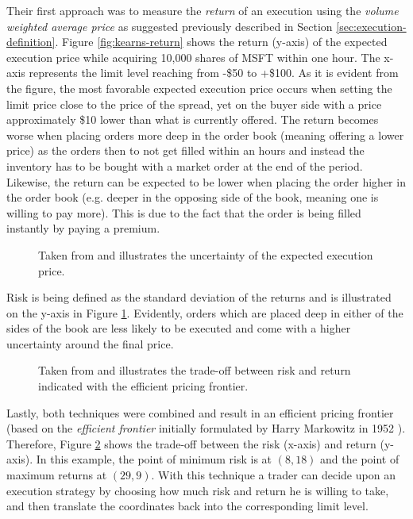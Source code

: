 Their first approach was to measure the \textit{return} of an execution using the \textit{volume weighted average price} as suggested previously described in Section \ref{sec:execution-definition}.
Figure \ref{fig:kearns-return} shows the return (y-axis) of the expected execution price while acquiring 10,000 shares of MSFT within one hour.
The x-axis represents the limit level reaching from -\$50 to +\$100.
As it is evident from the figure, the most favorable expected execution price occurs when setting the limit price close to the price of the spread, yet on the buyer side with a price approximately \$10 lower than what is currently offered.
The return becomes worse when placing orders more deep in the order book (meaning offering a lower price) as the orders then to not get filled within an hours and instead the inventory has to be bought with a market order at the end of the period.
Likewise, the return can be expected to be lower when placing the order higher in the order book (e.g. deeper in the opposing side of the book, meaning one is willing to pay more).
This is due to the fact that the order is being filled instantly by paying a premium.

\begin{figure}[H]
    \centering
    \caption{Taken from \cite{nevmyvaka2005electronic} and illustrates the uncertainty of the expected execution price.}
    \label{fig:kearns-std}
\end{figure}

Risk is being defined as the standard deviation of the returns and is illustrated on the y-axis in Figure \ref{fig:kearns-std}.
Evidently, orders which are placed deep in either of the sides of the book are less likely to be executed and come with a higher uncertainty around the final price.

\begin{figure}[H]
    \centering
    \caption{Taken from \cite{nevmyvaka2005electronic} and illustrates the trade-off between risk and return indicated with the efficient pricing frontier.}
    \label{fig:kearns-frontier}
\end{figure}

Lastly, both techniques were combined and result in an efficient pricing frontier (based on the \textit{efficient frontier} initially formulated by Harry Markowitz in 1952 \cite{markowitz1952portfolio}). Therefore, Figure \ref{fig:kearns-frontier} shows the trade-off between the risk (x-axis) and return (y-axis).
In this example, the point of minimum risk is at $(8, 18)$ and the point of maximum returns at $(29, 9)$.
With this technique a trader can decide upon an execution strategy by choosing how much risk and return he is willing to take, and then translate the coordinates back into the corresponding limit level.

